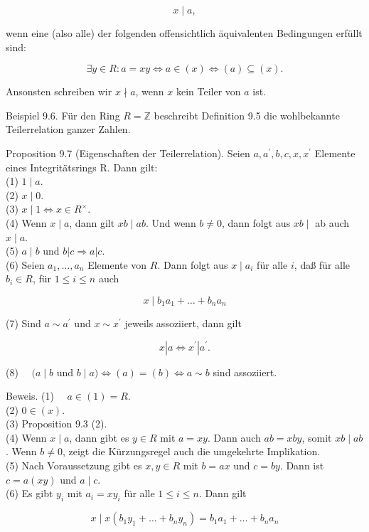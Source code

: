 \documentclass[10pt, letterpaper]{article}
\begin{document}
$$
x \mid a,
$$

wenn eine (also alle) der folgenden offensichtlich äquivalenten Bedingungen erfüllt sind:

$$
\exists y \in R: a=x y \Longleftrightarrow a \in(x) \Longleftrightarrow(a) \subseteq(x) .
$$

Ansonsten schreiben wir $x \nmid a$, wenn $x$ kein Teiler von $a$ ist.

Beispiel 9.6. Für den Ring $R=\mathbb{Z}$ beschreibt Definition 9.5 die wohlbekannte Teilerrelation ganzer Zahlen.

Proposition 9.7 (Eigenschaften der Teilerrelation). Seien $a, a^{\prime}, b, c, x, x^{\prime}$ Elemente eines Integritätsrings R. Dann gilt:\\
(1) $1 \mid a$.\\
(2) $x \mid 0$.\\
(3) $x \mid 1 \Longleftrightarrow x \in R^{\times}$.\\
(4) Wenn $x \mid a$, dann gilt $x b \mid a b$. Und wenn $b \neq 0$, dann folgt aus $x b \mid$ ab auch $x \mid a$.\\
(5) $a \mid b$ und $b|c \Longrightarrow a| c$.\\
(6) Seien $a_{1}, \ldots, a_{n}$ Elemente von $R$. Dann folgt aus $x \mid a_{i}$ für alle $i$, daß für alle $b_{i} \in R$, für $1 \leq i \leq n$ auch

$$
x \mid b_{1} a_{1}+\ldots+b_{n} a_{n}
$$

(7) Sind $a \sim a^{\prime}$ und $x \sim x^{\prime}$ jeweils assoziiert, dann gilt

$$
x\left|a \Longleftrightarrow x^{\prime}\right| a^{\prime} .
$$

(8) $\quad(a \mid b$ und $b \mid a) \Longleftrightarrow(a)=(b) \Longleftrightarrow a \sim b$ sind assoziiert.

Beweis. (1) $\quad a \in(1)=R$.\\
(2) $0 \in(x)$.\\
(3) Proposition 9.3 (2).\\
(4) Wenn $x \mid a$, dann gibt es $y \in R$ mit $a=x y$. Dann auch $a b=x b y$, somit $x b \mid a b$. Wenn $b \neq 0$, zeigt die Kürzungsregel auch die umgekehrte Implikation.\\
(5) Nach Voraussetzung gibt es $x, y \in R$ mit $b=a x$ und $c=b y$. Dann ist $c=a(x y)$ und $a \mid c$.\\
(6) Es gibt $y_{i}$ mit $a_{i}=x y_{i}$ für alle $1 \leq i \leq n$. Dann gilt

$$
x \mid x\left(b_{1} y_{1}+\ldots+b_{n} y_{n}\right)=b_{1} a_{1}+\ldots+b_{n} a_{n}
$$
\end{document}

